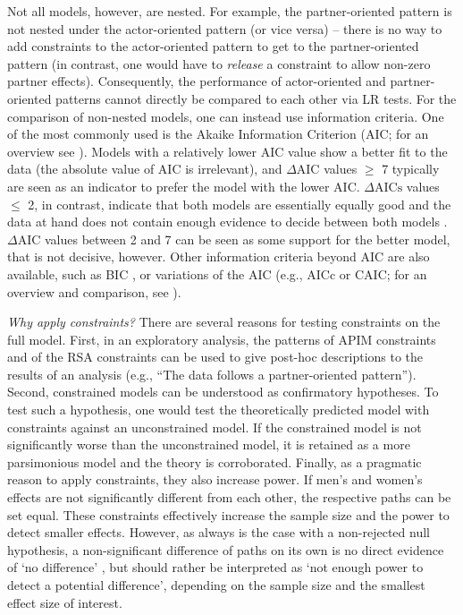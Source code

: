 \documentclass[jou,a4paper,draftfirst]{apa6}
\begin{document}
Not all models, however, are nested. For example, the partner-oriented pattern is not nested under the actor-oriented pattern (or vice versa) -- there is no way to add constraints to the actor-oriented pattern to get to the partner-oriented pattern (in contrast, one would have to \textit{release} a constraint to allow non-zero partner effects). Consequently, the performance of actor-oriented and partner-oriented patterns cannot directly be compared to each other via LR tests. For the comparison of non-nested models, one can instead use information criteria. One of the most commonly used is the Akaike Information Criterion (AIC; for an overview see ). Models with a relatively lower AIC value show a better fit to the data (the absolute value of AIC is irrelevant), and $\Delta \text{AIC}$ values $\geq$ 7 typically are seen as an indicator to prefer the model with the lower AIC. $\Delta \text{AICs}$ values $\leq$ 2, in contrast, indicate that both models are essentially equally good and the data at hand does not contain enough evidence to decide between both models \parencite{burnham_aic_2011,symonds_brief_2011}. $\Delta \text{AIC}$ values between 2 and 7 can be seen as some support for the better model, that is not decisive, however. Other information criteria beyond AIC are also available, such as BIC \parencite{Burnham_Anderson_2004}, or variations of the AIC (e.g., AICc or CAIC; for an overview and comparison, see ).

\emph{Why apply constraints?}
There are several reasons for testing constraints on the full model. First, in an exploratory analysis, the patterns of APIM constraints and of the RSA constraints can be used to give post-hoc descriptions to the results of an analysis (e.g., ``The data follows a partner-oriented pattern''). Second, constrained models can be understood as confirmatory hypotheses. To test such a hypothesis, one would test the theoretically predicted model with constraints against an unconstrained model. If the constrained model is not significantly worse than the unconstrained model, it is retained as a more parsimonious model and the theory is corroborated. Finally, as a pragmatic reason to apply constraints, they also increase power. If men's and women's effects are not significantly different from each other, the respective paths can be set equal. These constraints effectively increase the sample size and the power to detect smaller effects. However, as always is the case with a non-rejected null hypothesis, a non-significant difference of paths on its own is no direct evidence of `no difference' \parencite[e.g.,][]{goodman_dirty_2008}, but should rather be interpreted as `not enough power to detect a potential difference', depending on the sample size and the smallest effect size of interest.
\end{document}
